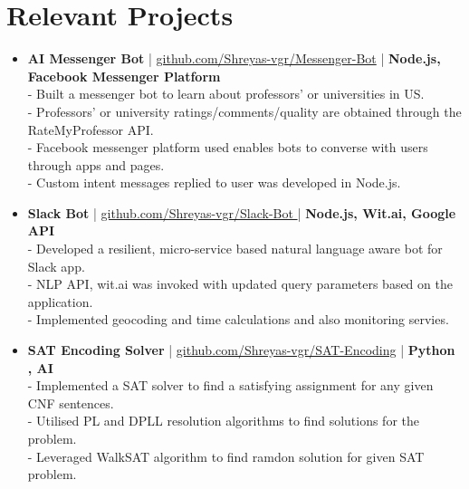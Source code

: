 \section{Relevant Projects}
\begin{itemize}
 \item \textbf{AI Messenger Bot} | \href{https://github.com/Shreyas-vgr/Messenger-Bot}{github.com/Shreyas-vgr/Messenger-Bot} | \textbf{Node.js, Facebook Messenger Platform}\\
 - Built a messenger bot to learn about professors' or universities in US.\\
 - Professors' or university ratings/comments/quality are obtained through the RateMyProfessor API.\\
 - Facebook messenger platform used enables bots to converse with users through apps and pages.\\
 - Custom intent messages replied to user was developed in Node.js.

 \item \textbf{Slack Bot} | \href{https://github.com/Shreyas-vgr/Slack-Bot}{github.com/Shreyas-vgr/Slack-Bot }| \textbf{Node.js, Wit.ai, Google API}\\
 - Developed a resilient, micro-service based natural language aware bot for Slack app.\\
 - NLP API, wit.ai was invoked with updated query parameters based on the application.\\
 - Implemented geocoding and time calculations and also monitoring servies.

 \item \textbf{SAT Encoding Solver} | \href{https://github.com/Shreyas-vgr/SAT-Encoding}{github.com/Shreyas-vgr/SAT-Encoding} | \textbf{Python , AI}\\
 - Implemented a SAT solver to find a satisfying assignment for any given CNF sentences.\\
 - Utilised PL and DPLL resolution algorithms to find solutions for the problem.\\
 - Leveraged WalkSAT algorithm to find ramdon solution for given SAT problem.



\end{itemize}
